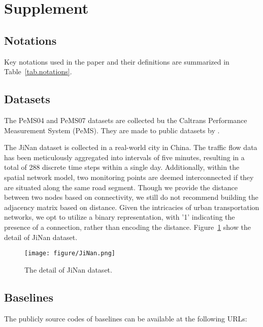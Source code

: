 \section{Supplement}

\subsection{Notations}

Key notations used in the paper and their definitions are summarized in Table~\ref{tab.notations}.



\subsection{Datasets}

The PeMS04 and PeMS07 datasets are collected bu the Caltrans Performance Measurement System (PeMS). They are made to public datasets by \cite{song2020STSGCNaaai}.

The JiNan dataset is collected in a real-world city in China. The traffic flow data has been meticulously aggregated into intervals of five minutes, resulting in a total of 288 discrete time steps within a single day. Additionally, within the spatial network model, two monitoring points are deemed interconnected if they are situated along the same road segment. Though we provide the distance between two nodes based on connectivity, we still do not recommend building the adjacency matrix based on distance. Given the intricacies of urban transportation networks, we opt to utilize a binary representation, with '1' indicating the presence of a connection, rather than encoding the distance. Figure~\ref{fig:JiNan} show the detail of JiNan dataset.

\begin{figure}[http]
    \centering
    \vspace{-2mm}
    \texttt{[image: figure/JiNan.png]}
    \caption{The detail of JiNan dataset.}
    \vspace{-6mm}
    \label{fig:JiNan}
\end{figure}

\subsection{Baselines}
The publicly source codes of baselines can be available at the following URLs:


